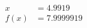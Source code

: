 \documentclass[preview]{standalone}
\begin{document}
\begin{align*}
x &= 4.9919\\f(x) &= 7.9999919
\end{align*}
\end{document}
